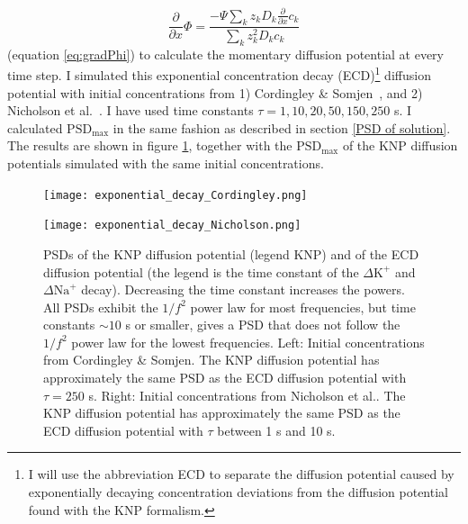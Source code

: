 \documentclass{uiophd}
\begin{document}
\begin{equation*}
\frac{\partial}{\partial x} \Phi = \frac{-\Psi \sum_k z_k D_k \frac{\partial}{\partial x} c_k}{\sum_k z_k^2 D_k c_k}
\end{equation*}
(equation \ref{eq:gradPhi}) to calculate the momentary diffusion potential at every time step. I simulated this exponential concentration decay (ECD)\footnote{I will use the abbreviation ECD to separate the diffusion potential caused by exponentially decaying concentration deviations from the diffusion potential found with the KNP formalism.} diffusion potential with initial concentrations from 1) Cordingley \& Somjen~\cite{CordingleySomjen}, and 2) Nicholson et al.~\cite{Nicholson1987}. I have used time constants $\tau = 1,10,20,50, 150, 250$ s. I calculated $\text{PSD}_{\text{max}}$ in the same fashion as described in section \ref{PSD of solution}. The results are shown in figure \ref{fig:exponential_decay}, together with the $\text{PSD}_{\text{max}}$ of the KNP diffusion potentials simulated with the same initial concentrations. 

\begin{figure}
   \begin{minipage}[b]{0.475\textwidth}
    \texttt{[image: exponential\_decay\_Cordingley.png]}
  \end{minipage}
  \hfill
  \begin{minipage}[b]{0.475\textwidth}
    \texttt{[image: exponential\_decay\_Nicholson.png]}
  \end{minipage}
  \caption{PSDs of the KNP diffusion potential (legend KNP) and of the ECD diffusion potential (the legend is the time constant of the $\Delta\text{K}^+$ and $\Delta\text{Na}^+$ decay). Decreasing the time constant increases the powers. All PSDs exhibit the $1/f^2$ power law for most frequencies, but time constants $\sim 10$ s or smaller, gives a PSD that does not follow the $1/f^2$ power law for the lowest frequencies. Left: Initial concentrations from Cordingley \& Somjen. The KNP diffusion potential has approximately the same PSD as the ECD diffusion potential with $\tau = 250$ s. Right: Initial concentrations from Nicholson et al.. The KNP diffusion potential has approximately the same PSD as the ECD diffusion potential with $\tau$ between 1 s and 10 s.}
  \label{fig:exponential_decay}
\end{figure}
\end{document}
